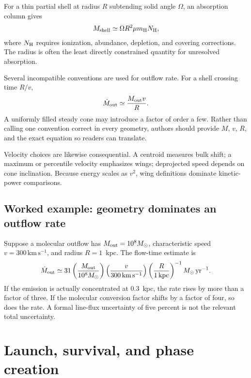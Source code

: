 For a thin partial shell at radius $R$ subtending solid angle $\Omega$, an absorption
column gives
\begin{equation}
 M_{\rm shell}\simeq\Omega R^2\mu m_{\rm H}N_{\rm H},
 \label{eq:shell-mass-column}
\end{equation}
where $N_{\rm H}$ requires ionization, abundance, depletion, and covering corrections.
The radius is often the least directly constrained quantity for unresolved absorption.

Several incompatible conventions are used for outflow rate.  For a shell crossing
time $R/v$,
\begin{equation}
 \dot M_{\rm out}\simeq\frac{M_{\rm out}v}{R}.
 \label{eq:outflow-rate-thin-shell}
\end{equation}
A uniformly filled steady cone may introduce a factor of order a few.  Rather than
calling one convention correct in every geometry, authors should provide $M$, $v$,
$R$, and the exact equation so readers can translate.

Velocity choices are likewise consequential.  A centroid measures bulk shift; a
maximum or percentile velocity emphasizes wings; deprojected speed depends on cone
inclination.  Because energy scales as $v^2$, wing definitions dominate kinetic-power
comparisons.

\subsection{Worked example: geometry dominates an outflow rate}

Suppose a molecular outflow has $M_{\rm out}=10^8M_\odot$, characteristic speed
$v=300\,\mathrm{km\,s^{-1}}$, and radius $R=1$~kpc.  The flow-time estimate is
\begin{equation}
 \dot M_{\rm out}\simeq31
 \left(\frac{M_{\rm out}}{10^8M_\odot}\right)
 \left(\frac{v}{300\,\mathrm{km\,s^{-1}}}\right)
 \left(\frac{R}{1\,\mathrm{kpc}}\right)^{-1}
 M_\odot\,\mathrm{yr^{-1}}.
\end{equation}
If the emission is actually concentrated at 0.3~kpc, the rate rises by more than a
factor of three.  If the molecular conversion factor shifts by a factor of four, so
does the rate.  A formal line-flux uncertainty of five percent is not the relevant
total uncertainty.

\section{Launch, survival, and phase creation}

